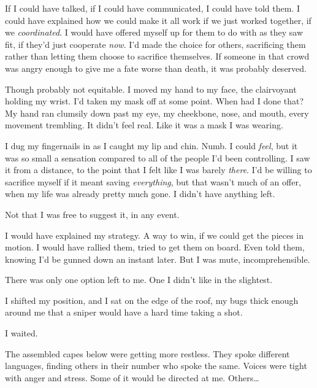 If I could have talked, if I could have communicated, I could have told them.  I could have explained how we could make it all work if we just worked together, if we \emph{coordinated}.  I would have offered myself up for them to do with as they saw fit, if they'd just cooperate \emph{now}.  I'd made the choice for others, sacrificing them rather than letting them choose to sacrifice themselves.  If someone in that crowd was angry enough to give me a fate worse than death, it was probably deserved.



Though probably not equitable.  I moved my hand to my face, the clairvoyant holding my wrist.  I'd taken my mask off at some point.  When had I done that?  My hand ran clumsily down past my eye, my cheekbone, nose, and mouth, every movement trembling.  It didn't feel real.  Like it was a mask I was wearing.



I dug my fingernails in as I caught my lip and chin.  Numb.  I could \emph{feel}, but it was so small a sensation compared to all of the people I'd been controlling.  I saw it from a distance, to the point that I felt like I was barely \emph{there}.  I'd be willing to sacrifice myself if it meant saving \emph{everything}, but that wasn't much of an offer, when my life was already pretty much gone.  I didn't have anything left.



Not that I was free to suggest it, in any event.



I would have explained my strategy.  A way to win, if we could get the pieces in motion.  I would have rallied them, tried to get them on board.  Even told them, knowing I'd be gunned down an instant later.  But I was mute, incomprehensible.



There was only one option left to me.  One I didn't like in the slightest.



I shifted my position, and I sat on the edge of the roof, my bugs thick enough around me that a sniper would have a hard time taking a shot.



I waited.



The assembled capes below were getting more restless.  They spoke different languages, finding others in their number who spoke the same.  Voices were tight with anger and stress.  Some of it would be directed at me.  Others\ldots



